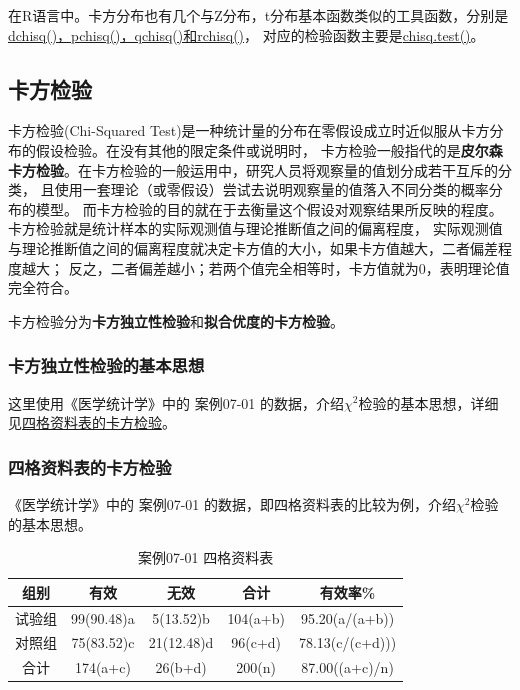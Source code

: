 \documentclass[
]{article}
\begin{document}
在R语言中。卡方分布也有几个与Z分布，t分布基本函数类似的工具函数，分别是\href{https://www.rdocumentation.org/packages/stats/versions/3.6.2/topics/Chisquare}{dchisq()，pchisq()，qchisq()和rchisq()}，
对应的检验函数主要是\href{https://www.rdocumentation.org/packages/stats/versions/3.6.2/topics/chisq.test}{chisq.test()}。

\hypertarget{ux5361ux65b9ux68c0ux9a8c}{%
\subsection{卡方检验}\label{ux5361ux65b9ux68c0ux9a8c}}

卡方检验(Chi-Squared Test)是一种统计量的分布在零假设成立时近似服从卡方分布的假设检验。在没有其他的限定条件或说明时，
卡方检验一般指代的是\textbf{皮尔森卡方检验}。在卡方检验的一般运用中，研究人员将观察量的值划分成若干互斥的分类，
且使用一套理论（或零假设）尝试去说明观察量的值落入不同分类的概率分布的模型。
而卡方检验的目的就在于去衡量这个假设对观察结果所反映的程度。卡方检验就是统计样本的实际观测值与理论推断值之间的偏离程度，
实际观测值与理论推断值之间的偏离程度就决定卡方值的大小，如果卡方值越大，二者偏差程度越大；
反之，二者偏差越小；若两个值完全相等时，卡方值就为0，表明理论值完全符合。

卡方检验分为\textbf{卡方独立性检验}和\textbf{拟合优度的卡方检验}。

\hypertarget{ux5361ux65b9ux72ecux7acbux6027ux68c0ux9a8cux7684ux57faux672cux601dux60f3}{%
\subsubsection{卡方独立性检验的基本思想}\label{ux5361ux65b9ux72ecux7acbux6027ux68c0ux9a8cux7684ux57faux672cux601dux60f3}}

这里使用《医学统计学》中的 案例07-01 的数据，介绍\(\chi^2\)检验的基本思想，详细见\protect\hyperlink{ux56dbux683cux8d44ux6599ux8868ux7684ux5361ux65b9ux68c0ux9a8c}{四格资料表的卡方检验}。

\hypertarget{ux56dbux683cux8d44ux6599ux8868ux7684ux5361ux65b9ux68c0ux9a8c}{%
\subsubsection{四格资料表的卡方检验}\label{ux56dbux683cux8d44ux6599ux8868ux7684ux5361ux65b9ux68c0ux9a8c}}

《医学统计学》中的 案例07-01 的数据，即四格资料表的比较为例，介绍\(\chi^2\)检验的基本思想。

\begin{table}

\caption{\label{tab:chisqtab}案例07-01 四格资料表}
\centering
\begin{tabular}[t]{ccccc}
\toprule
组别 & 有效 & 无效 & 合计 & 有效率\%\\
\midrule
试验组 & 99(90.48)a & 5(13.52)b & 104(a+b) & 95.20(a/(a+b))\\
对照组 & 75(83.52)c & 21(12.48)d & 96(c+d) & 78.13(c/(c+d)))\\
合计 & 174(a+c) & 26(b+d) & 200(n) & 87.00((a+c)/n)\\
\bottomrule
\end{tabular}
\end{table}
\end{document}
